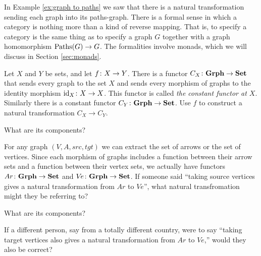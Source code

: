 \documentclass[CT4S-EN-RU]{subfiles}
\begin{document}
\begin{exampleRUS}\label{ex:concat paths of paths}
\end{exampleRUS}

\begin{remarkENG}
In Example \ref{ex:graph to paths} we saw that there is a natural transformation sending each graph into its paths-graph. There is a formal sense in which a category is nothing more than a kind of reverse mapping. That is, to specify a category is the same thing as to specify a graph $G$ together with a graph homomorphism $\textnormal{Paths}(G)\rightarrow G$. The formalities involve monads, which we will discuss in Section \ref{sec:monads}.
\end{remarkENG}

\begin{remarkRUS}
\end{remarkRUS}

\begin{exerciseENG}
Let $X$ and $Y$ be sets, and let $f\colon X\rightarrow Y$. There is a functor $C_X\colon{\bf Grph}\rightarrow{\bf Set}$ that sends every graph to the set $X$ and sends every morphism of graphs to the identity morphism $\textnormal{id}_X\colon X\rightarrow X$. This functor is called {\em the constant functor at $X$}. Similarly there is a constant functor $C_Y\colon{\bf Grph}\rightarrow{\bf Set}$.
\sexc Use $f$ to construct a natural transformation $C_X\to C_Y$.
\item What are its components?
\endsexc
\end{exerciseENG}

\begin{exerciseRUS}
\end{exerciseRUS}

\begin{exerciseENG}
For any graph $(V,A,src,tgt)$ we can extract the set of arrows or the set of vertices. Since each morphism of graphs includes a function between their arrow sets and a function between their vertex sets, we actually have functors $Ar\colon{\bf Grph}\rightarrow{\bf Set}$ and $V\!e\colon{\bf Grph}\rightarrow{\bf Set}$.
\sexc If someone said “taking source vertices gives a natural transformation from $Ar$ to $V\!e$”, what natural transfromation might they be referring to?
\item What are its components? 
\item If a different person, say from a totally different country, were to say “taking target vertices also gives a natural transformation from $Ar$ to $V\!e$,” would they also be correct?
\endsexc
\end{exerciseENG}
\end{document}
